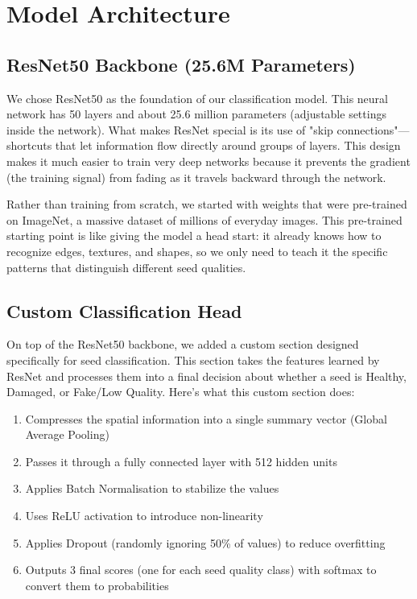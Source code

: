 \section{Model Architecture}

\subsection{ResNet50 Backbone (25.6M Parameters)}

We chose ResNet50 as the foundation of our classification model. This neural network has 50 layers and about 25.6 million parameters (adjustable settings inside the network). What makes ResNet special is its use of "skip connections"—shortcuts that let information flow directly around groups of layers. This design makes it much easier to train very deep networks because it prevents the gradient (the training signal) from fading as it travels backward through the network.

Rather than training from scratch, we started with weights that were pre-trained on ImageNet, a massive dataset of millions of everyday images. This pre-trained starting point is like giving the model a head start: it already knows how to recognize edges, textures, and shapes, so we only need to teach it the specific patterns that distinguish different seed qualities.

\subsection{Custom Classification Head}

On top of the ResNet50 backbone, we added a custom section designed specifically for seed classification. This section takes the features learned by ResNet and processes them into a final decision about whether a seed is Healthy, Damaged, or Fake/Low Quality. Here's what this custom section does:

\begin{enumerate}
    \item Compresses the spatial information into a single summary vector (Global Average Pooling)
    \item Passes it through a fully connected layer with 512 hidden units
    \item Applies Batch Normalisation to stabilize the values
    \item Uses ReLU activation to introduce non-linearity
    \item Applies Dropout (randomly ignoring 50\% of values) to reduce overfitting
    \item Outputs 3 final scores (one for each seed quality class) with softmax to convert them to probabilities
\end{enumerate}


